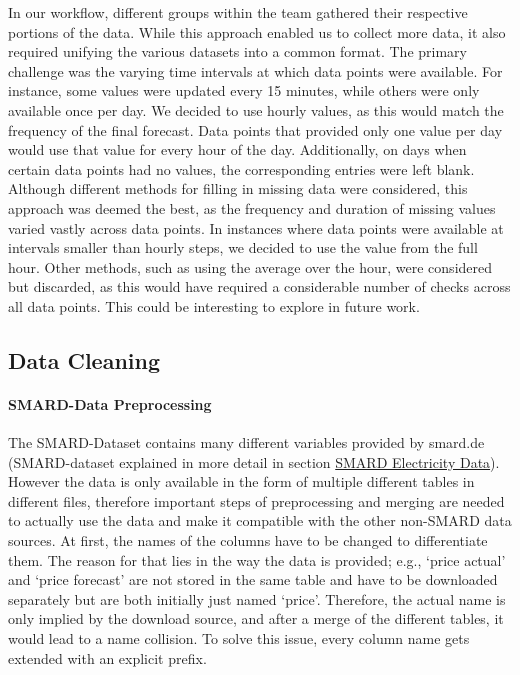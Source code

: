 \documentclass[a4paper]{article}
\begin{document}
In our workflow, different groups within the team gathered their
respective portions of the data. While this approach enabled us to
collect more data, it also required unifying the various datasets into a
common format. The primary challenge was the varying time intervals at
which data points were available. For instance, some values were updated
every 15 minutes, while others were only available once per day. We
decided to use hourly values, as this would match the frequency of the
final forecast. Data points that provided only one value per day would
use that value for every hour of the day. Additionally, on days when
certain data points had no values, the corresponding entries were left
blank. Although different methods for filling in missing data were
considered, this approach was deemed the best, as the frequency and
duration of missing values varied vastly across data points. In
instances where data points were available at intervals smaller than
hourly steps, we decided to use the value from the full hour. Other
methods, such as using the average over the hour, were considered but
discarded, as this would have required a considerable number of checks
across all data points. This could be interesting to explore in future
work.

    \subsection{Data Cleaning}\label{data-cleaning}

    \paragraph{SMARD-Data Preprocessing}\label{smard-data-preprocessing}

The SMARD-Dataset contains many different variables provided by smard.de
(SMARD-dataset explained in more detail in section
\hyperref[smard-electricity-market-data]{SMARD Electricity Data}).
However the data is only available in the form of multiple different
tables in different files, therefore important steps of preprocessing
and merging are needed to actually use the data and make it compatible
with the other non-SMARD data sources. At first, the names of the
columns have to be changed to differentiate them. The reason for that
lies in the way the data is provided; e.g., `price actual' and `price
forecast' are not stored in the same table and have to be downloaded
separately but are both initially just named `price'. Therefore, the
actual name is only implied by the download source, and after a merge of
the different tables, it would lead to a name collision. To solve this
issue, every column name gets extended with an explicit prefix.
\end{document}
